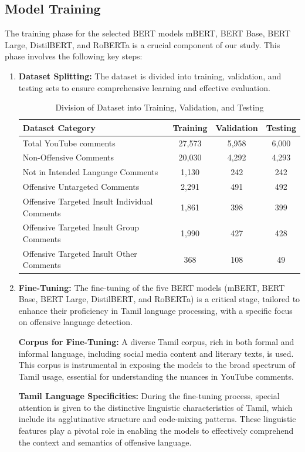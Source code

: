 \documentclass{svproc}
\begin{document}
\subsection{Model Training}
The training phase for the selected BERT models mBERT, BERT Base, BERT Large, DistilBERT, and RoBERTa is a crucial component of our study. This phase involves the following key steps:
\begin{enumerate}
    \item \textbf{Dataset Splitting:} The dataset is divided into training, validation, and testing sets to ensure comprehensive learning and effective evaluation.    
    \begin{table}[h]
    \caption{Division of Dataset into Training, Validation, and Testing}
    \centering
    \begin{tabular}{|l|c|c|c|}
    \hline
    \textbf{Dataset Category} & \textbf{Training} & \textbf{Validation} & \textbf{Testing} \\
    \hline
    Total YouTube comments & 27,573 & 5,958 & 6,000 \\
    Non-Offensive Comments & 20,030 & 4,292 & 4,293 \\
    Not in Intended Language Comments & 1,130 & 242 & 242 \\
    Offensive Untargeted Comments & 2,291 & 491 & 492 \\
    Offensive Targeted Insult Individual Comments & 1,861 & 398 & 399 \\
    Offensive Targeted Insult Group Comments & 1,990 & 427 & 428 \\
    Offensive Targeted Insult Other Comments & 368 & 108 & 49 \\
    \hline
    \end{tabular}
    \end{table}
    \item \textbf{Fine-Tuning:}
The fine-tuning of the five BERT models (mBERT, BERT Base, BERT Large, DistilBERT, and RoBERTa) is a critical stage, tailored to enhance their proficiency in Tamil language processing, with a specific focus on offensive language detection.

\textbf{Corpus for Fine-Tuning:} A diverse Tamil corpus, rich in both formal and informal language, including social media content and literary texts, is used. This corpus is instrumental in exposing the models to the broad spectrum of Tamil usage, essential for understanding the nuances in YouTube comments.

\textbf{Tamil Language Specificities:} During the fine-tuning process, special attention is given to the distinctive linguistic characteristics of Tamil, which include its agglutinative structure and code-mixing patterns. These linguistic features play a pivotal role in enabling the models to effectively comprehend the context and semantics of offensive language.


\end{enumerate}
\end{document}
